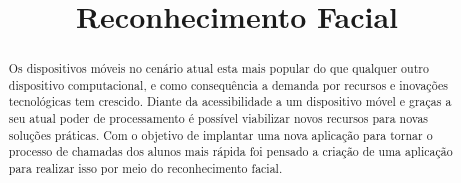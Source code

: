 \documentclass[conference]{IEEEtran}
\begin{document}
%
\title{Reconhecimento Facial}


\author{
}


% 


\maketitle

\begin{abstract}
Os dispositivos móveis no cenário atual esta mais popular do que qualquer outro dispositivo computacional, e como consequência a demanda por recursos e inovações tecnológicas tem crescido.
Diante da acessibilidade a um dispositivo móvel e graças a seu atual poder de processamento é possível viabilizar novos recursos para novas soluções práticas.
Com o objetivo de implantar uma nova aplicação para tornar o processo de chamadas dos alunos mais rápida foi pensado a criação de uma aplicação para realizar isso por meio do reconhecimento facial. 
\end{abstract}
\end{document}
